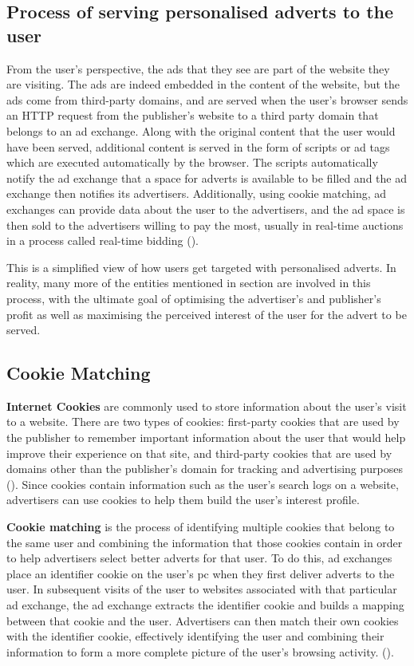 \documentclass{l4proj}
\begin{document}
\subsection{Process of serving personalised adverts to the user}
From the user's perspective, the ads that they see are part of the website they are visiting. The ads are indeed embedded in the content of the website, but the ads come from third-party domains, and are served when the user's browser sends an HTTP request from the publisher's website to a third party domain that belongs to an ad exchange. Along with the original content that the user would have been served, additional content is served in the form of scripts or ad tags which are executed automatically by the browser. The scripts automatically notify the ad exchange that a space for adverts is available to be filled and the ad exchange then notifies its advertisers. Additionally, using cookie matching, ad exchanges can provide data about the user to the advertisers, and the ad space is then sold to the advertisers willing to pay the most, usually in real-time auctions in a process called real-time bidding (\cite{Estrada-Jimenez2017}).

This is a simplified view of how users get targeted with personalised adverts. In reality, many more of the entities mentioned in section  are involved in this process, with the ultimate goal of optimising the advertiser's and publisher's profit as well as maximising the perceived interest of the user for the advert to be served.

\subsection{Cookie Matching}
\textbf{Internet Cookies} are commonly used to store information about the user's visit to a website. There are two types of cookies: first-party cookies that are used by the publisher to remember important information about the user that would help improve their experience on that site, and third-party cookies that are used by domains other than the publisher's domain for tracking and advertising purposes (\cite{Estrada-Jimenez2017}). Since cookies contain information such as the user's search logs on a website, advertisers can use cookies to help them build the user's interest profile. 

\textbf{Cookie matching} is the process of identifying multiple cookies that belong to the same user and combining the information that those cookies contain in order to help advertisers select better adverts for that user. To do this, ad exchanges place an identifier cookie on the user's pc when they first deliver adverts to the user. In subsequent visits of the user to websites associated with that particular ad exchange, the ad exchange extracts the identifier cookie and builds a mapping between that cookie and the user. Advertisers can then match their own cookies with the identifier cookie, effectively identifying the user and combining their information to form a more complete picture of the user's browsing activity. (\cite{cm}).
\end{document}
